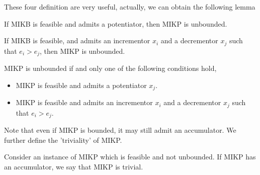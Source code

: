 \documentclass[a4paper,11pt]{article}
\begin{document}
These four definition are very useful, actually, we can obtain the following lemma
\begin{lemma}
If MIKB is feasible and admits a potentiator, then MIKP is unbounded.
\end{lemma}

\begin{lemma}
If MIKB is feasible, and admits an incrementor $x_i$ and a decrementor $x_j$ such that $e_i > e_j$, then MIKP is unbounded.
\end{lemma}

\begin{proposition}
MIKP is unbounded if and only one of the following conditions hold,
\begin{itemize}
\item MIKP is feasible and admits a potentiator $x_j$.
\item MIKP is feasible and admits an incrementor $x_i$ and a decrementor $x_j$ such that $e_i > e_j$.
\end{itemize}
\end{proposition}

Note that even if MIKP is bounded, it may still admit an accumulator. We further define the 'triviality' of MIKP.
\begin{definition}
Consider an instance of MIKP which is feasible and not unbounded. If MIKP has an accumulator, we say that MIKP is trivial.
\end{definition}
\end{document}
